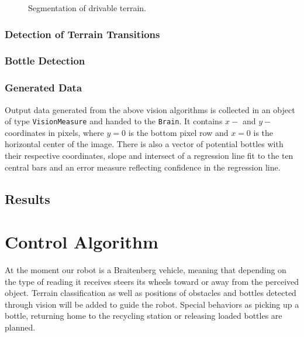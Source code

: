 \begin{figure}
\center
{}
\hfill
{}
\label{fig:segmentation}
\caption{Segmentation of drivable terrain.}
\end{figure}

\subsubsection{Detection of Terrain Transitions}


\subsubsection{Bottle Detection}

\subsubsection{Generated Data}
Output data generated from the above vision algorithms is collected in an object of type
\texttt{VisionMeasure} and handed to the \texttt{Brain}. It contains $x-$ and $y-$coordinates
in pixels, where $y=0$ is the bottom pixel row and $x=0$ is the horizontal center of the
image. There is also a vector of potential bottles with their respective coordinates,
slope and intersect of a regression line fit to the ten central bars and an error measure
reflecting confidence in the regression line.

\subsection{Results}

\section{Control Algorithm}
At the moment our robot is a Braitenberg vehicle, meaning that depending on the type
of reading it receives steers its wheels toward or away from the perceived object. 
Terrain classification as well as positions of obstacles and bottles detected through 
vision will be added to guide the robot. Special behaviors as picking up a bottle, 
returning home to the recycling station or releasing loaded bottles are planned.
